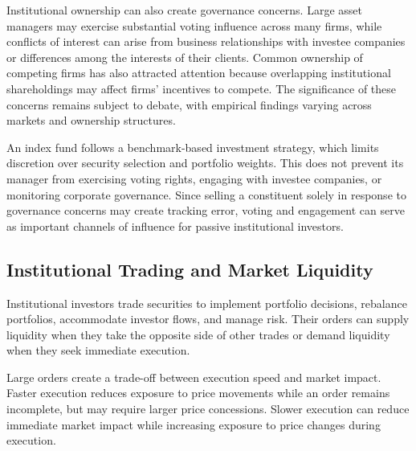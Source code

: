 Institutional ownership can also create governance concerns.
Large asset managers may exercise substantial voting influence
across many firms, while conflicts of interest can arise from
business relationships with investee companies or differences
among the interests of their clients. Common ownership of
competing firms has also attracted attention because overlapping
institutional shareholdings may affect firms' incentives to
compete. The significance of these concerns remains subject
to debate, with empirical findings varying across markets
and ownership structures.

\begin{tcolorbox}[
  enhanced,
  breakable,
  colback=white,
  colframe=FinanceBlue,
  boxrule=0.7pt,
  sharp corners,
  borderline west={2.2pt}{0pt}{FinanceBlue},
  title=\textbf{Financial Perspective: Passive Investing Does Not Preclude Active Stewardship},
  coltitle=white,
  colbacktitle=FinanceBlue,
  fonttitle=\bfseries,
  before skip=1.2em,
  after skip=1.2em
]

An index fund follows a benchmark-based investment strategy,
which limits discretion over security selection and portfolio
weights. This does not prevent its manager from exercising
voting rights, engaging with investee companies, or monitoring corporate governance. Since selling a constituent solely in response to governance concerns may create tracking error, voting and engagement can serve as important channels of influence for passive institutional investors.

\end{tcolorbox}

\subsection{Institutional Trading and Market Liquidity}

Institutional investors trade securities to implement portfolio decisions, rebalance portfolios, accommodate investor flows, and manage risk. Their orders can supply liquidity when they take the opposite side of other trades or demand liquidity when they seek immediate execution.

Large orders create a trade-off between execution speed and market impact. Faster execution reduces exposure to price movements while an order remains incomplete, but may require larger price concessions. Slower execution can reduce immediate market impact while increasing exposure to price changes during execution.

